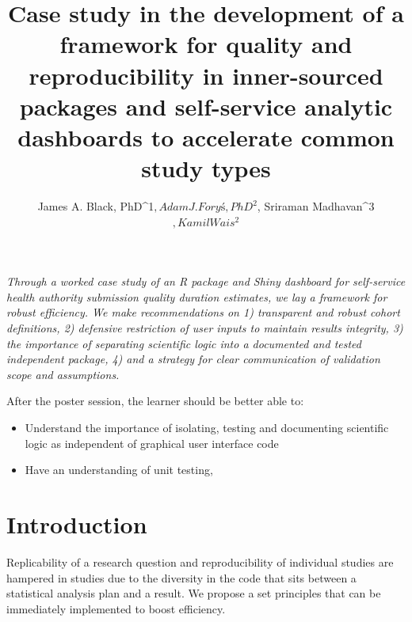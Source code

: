 \documentclass{amia}
\begin{document}

\textit{Through a worked case study of an R package and Shiny dashboard for self-service health authority submission quality duration estimates, we lay a framework for robust efficiency. We make recommendations on 1) transparent and robust cohort definitions, 2) defensive restriction of user inputs to maintain results integrity, 3) the importance of separating scientific logic into a documented and tested independent package, 4) and a strategy for clear communication of validation scope and assumptions.}

After the poster session, the learner should be better able to:

\begin{itemize}
  \item Understand the importance of isolating, testing and documenting scientific logic as independent of graphical user interface code
  \item Have an understanding of unit testing, 
\end{itemize}

\pagebreak

\title{Case study in the development of a framework for quality and reproducibility in inner-sourced packages and self-service analytic dashboards to accelerate common study types}

\author{James A. Black, PhD^{1}$, Adam J. Foryś, PhD^{2}$, Sriraman Madhavan^{3}$, Kamil Wais^{2}$}


\maketitle

\section*{Introduction}

Replicability of a research question and reproducibility of individual studies are hampered in studies due to the diversity in the code that sits between a statistical analysis plan and a result. We propose a set principles that can be immediately implemented to boost efficiency. 
\end{document}
